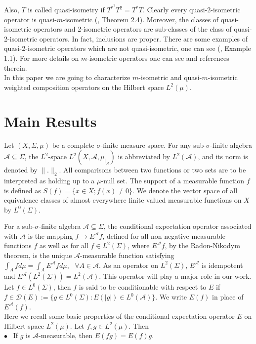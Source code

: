\documentclass{amsart}
\theoremstyle{definition}\newtheorem{defn}[thm]{Definition}
\theoremstyle{remark}
\numberwithin{equation}{section}
\begin{document}
Also, $T$ is called quasi-isometry if $T^{*^2}T^2=T^*T$. Clearly every
quasi-2-isometric operator is quasi-$m$-isometric (\cite{mp1}, Theorem 2.4). Moreover, the
classes of quasi-isometric operators and 2-isometric operators are sub-classes of the
class of quasi-2-isometric operators. In fact, inclusions are proper. There are some examples of quasi-2-isometric operators which are not quasi-isometric, one can see (\cite{mp1}, Example 1.1). For more details on $m$-isometric operators one can see \cite{as3, ber, bj,bm,cot,jl,mp} and references therein.\\
In this paper we are going to characterize $m$-isometric and quasi-$m$-isometric weighted composition operators on the Hilbert space $L^2(\mu)$.


\section{ \sc\bf Main Results}

Let $(X,\Sigma,\mu)$ be a complete $\sigma$-finite measure space.
For any sub-$\sigma$-finite algebra $\mathcal{A}\subseteq
 \Sigma$, the $L^2$-space
$L^2(X,\mathcal{A},\mu_{\mid_{\mathcal{A}}})$ is abbreviated  by
$L^2(\mathcal{A})$, and its norm is denoted by $\|.\|_2$. All
comparisons between two functions or two sets are to be
interpreted as holding up to a $\mu$-null set. The support of a
measurable function $f$ is defined as $S(f)=\{x\in X; f(x)\neq
0\}$. We denote the vector space of all equivalence classes of
almost everywhere finite valued measurable functions on $X$ by
$L^0(\Sigma)$.

\vspace*{0.3cm} For a sub-$\sigma$-finite algebra
$\mathcal{A}\subseteq\Sigma$, the conditional expectation operator
associated with $\mathcal{A}$ is the mapping $f\rightarrow
E^{\mathcal{A}}f$, defined for all non-negative measurable
functions $f$ as well as for all $f\in L^2(\Sigma)$, where
$E^{\mathcal{A}}f$, by the Radon-Nikodym theorem, is the unique
$\mathcal{A}$-measurable function satisfying
$\int_{A}fd\mu=\int_{A}E^{\mathcal{A}}fd\mu, \ \ \ \forall A\in
\mathcal{A}$. As an operator on $L^{2}({\Sigma})$,
$E^{\mathcal{A}}$ is idempotent and
$E^{\mathcal{A}}(L^2(\Sigma))=L^2(\mathcal{A})$. This operator
will play a major role in our work. Let $f\in L^0(\Sigma)$, then
$f$ is said to be conditionable with respect to $E$ if
$f\in\mathcal{D}(E):=\{g\in L^0(\Sigma): E(|g|)\in
L^0(\mathcal{A})\}$. We
write $E(f)$ in place of $E^{\mathcal{A}}(f)$.\\
Here we recall some basic properties of the conditional expectation operator $E$ on Hilbert space $L^2(\mu)$. Let $f,g\in L^2(\mu)$. Then\\
\vspace*{0.2cm} \noindent $\bullet$ \  If $g$ is
$\mathcal{A}$-measurable, then $E(fg)=E(f)g$.
\end{document}
